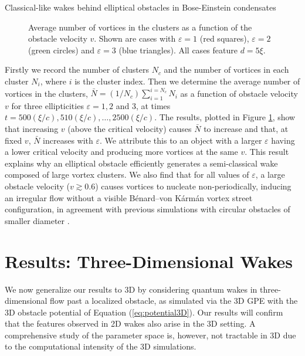 \begin{chapter}{\label{cha:wake}Classical-like wakes behind elliptical obstacles in Bose-Einstein condensates}
\begin{figure}
\centering
{}
\caption{\label{fig:Svslocal2} Average number of vortices in the clusters as a function of the obstacle velocity $v$.  Shown are cases with $\varepsilon=1$ (red squares),  $\varepsilon=2$ (green circles) and $\varepsilon=3$ (blue triangles).  All cases feature $d=5\xi$.}
\end{figure}

Firstly we record the number of clusters $N_c$ and the number of vortices in each cluster $N_i$, where $i$ is the cluster index. Then we determine the average number of vortices in the clusters, $\bar{N} = (1/N_c) \sum_{i=1}^{i=N_c} N_i$ as a function of obstacle velocity $v$ for three ellipticities $\varepsilon=1, 2$ and $3$, at times $t=500(\xi/c),510(\xi/c),\ldots,2500(\xi/c)$. The results, plotted in Figure \ref{fig:Svslocal2}, show that increasing $v$ (above the critical velocity) causes $\bar{N}$ to increase and that, at fixed $v$, $\bar{N}$ increases with $\varepsilon$. We attribute this to an object with a larger $\varepsilon$ having a lower critical velocity and producing more vortices at the same $v$.  This result explains why an elliptical obstacle efficiently generates a semi-classical wake composed of large vortex clusters. We also find that for all values of $\varepsilon$, a large obstacle velocity ($v\gtrsim0.6$) causes vortices to nucleate non-periodically, inducing an irregular flow without a visible B\'enard--von K\'arm\'an vortex street configuration, in agreement with previous simulations with circular obstacles of smaller diameter \cite{saito10}.

\section{Results: Three-Dimensional Wakes}
We now generalize our results to 3D by considering quantum wakes in three-dimensional flow past a localized obstacle, as simulated via the 3D GPE with the 3D obstacle potential of Equation (\ref{eq:potential3D}).  Our results will confirm that the features observed in 2D wakes also arise in the 3D setting.  A comprehensive study of the parameter space is, however, not tractable in 3D due to the computational intensity of the 3D simulations.


\end{chapter}
